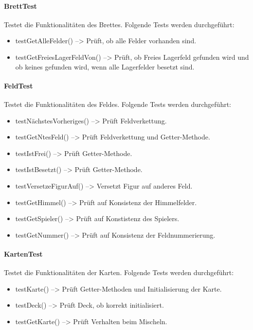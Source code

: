 \documentclass[12pt,halfparskip]{scrartcl}
\begin{document}
	\paragraph{BrettTest}\label{ssub:bretttest} %
	Testet die Funktionalitäten des Brettes. Folgende Tests werden durchgeführt:
	\begin{itemize}
		\item testGetAlleFelder() --> Prüft, ob alle Felder vorhanden sind.
		\item testGetFreiesLagerFeldVon() --> Prüft, ob Freies Lagerfeld gefunden wird und ob keines gefunden wird, wenn alle Lagerfelder besetzt sind.
	\end{itemize}
	\paragraph{FeldTest}\label{ssub:feldtest} %
	Testet die Funktionalitäten des Feldes. Folgende Tests werden durchgeführt:
	\begin{itemize}
		\item testNächstesVorheriges() --> Prüft Feldverkettung.
		\item testGetNtesFeld() --> Prüft Feldverkettung und Getter-Methode.
		\item testIstFrei() --> Prüft Getter-Methode.
		\item testIstBesetzt() --> Prüft Getter-Methode.
		\item testVersetzeFigurAuf() --> Versetzt Figur auf anderes Feld.
		\item testGetHimmel() --> Prüft auf Konsistenz der Himmelfelder.
		\item testGetSpieler() --> Prüft auf Konstistenz des Spielers.
		\item testGetNummer() --> Prüft auf Konsistenz der Feldnummerierung.
	\end{itemize}
	\paragraph{KartenTest}\label{ssub:kartentest} %
	Testet die Funktionalitäten der Karten. Folgende Tests werden durchgeführt:
	\begin{itemize}
		\item testKarte() --> Prüft Getter-Methoden und Initialisierung der Karte.
		\item testDeck() --> Prüft Deck, ob korrekt initialisiert.
		\item testGetKarte() --> Prüft Verhalten beim Mischeln.
	\end{itemize}
\end{document}
